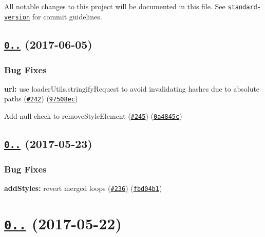 All notable changes to this project will be documented in this file. See \href{https://github.com/conventional-changelog/standard-version}{\tt standard-\/version} for commit guidelines.

\label{_0.18.2}%
 \subsection*{\href{https://github.com/webpack/style-loader/compare/v0.18.1...v0.18.2}{\tt 0..} (2017-\/06-\/05)}

\subsubsection*{Bug Fixes}


\begin{DoxyItemize}
\item {\bfseries url\+:} use {\ttfamily loader\+Utils.\+stringify\+Request} to avoid invalidating hashes due to absolute paths (\href{https://github.com/webpack/style-loader/issues/242}{\tt \#242}) (\href{https://github.com/webpack/style-loader/commit/97508ec}{\tt 97508ec})
\item Add {\ttfamily null} check to {\ttfamily remove\+Style\+Element} (\href{https://github.com/webpack/style-loader/issues/245}{\tt \#245}) (\href{https://github.com/webpack/style-loader/commit/0a4845c}{\tt 0a4845c})
\end{DoxyItemize}

\label{_0.18.1}%
 \subsection*{\href{https://github.com/webpack/style-loader/compare/v0.18.0...v0.18.1}{\tt 0..} (2017-\/05-\/23)}

\subsubsection*{Bug Fixes}


\begin{DoxyItemize}
\item {\bfseries add\+Styles\+:} revert merged loops (\href{https://github.com/webpack/style-loader/issues/236}{\tt \#236}) (\href{https://github.com/webpack/style-loader/commit/fbd04b1}{\tt fbd04b1})
\end{DoxyItemize}

\label{_0.18.0}%
 \section*{\href{https://github.com/webpack/style-loader/compare/v0.17.0...v0.18.0}{\tt 0..} (2017-\/05-\/22)}

